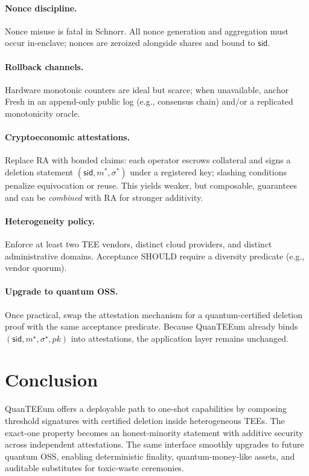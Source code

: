 \documentclass[runningheads,orivec]{llncs}
\newcommand{\prot}{\textsf{QuanTEEum}}
\newcommand{\sid}{\mathsf{sid}}
\begin{document}
\paragraph{Nonce discipline.}
Nonce misuse is fatal in Schnorr. All nonce generation and aggregation must occur in-enclave; nonces are zeroized alongside shares and bound to $\sid$.

\paragraph{Rollback channels.}
Hardware monotonic counters are ideal but scarce; when unavailable, anchor \textsf{Fresh} in an append-only public log (e.g., consensus chain) and/or a replicated monotonicity oracle.

\paragraph{Cryptoeconomic attestations.}
Replace RA with bonded claims: each operator escrows collateral and signs a deletion statement $(\sid,m^{*},\sigma^{*})$ under a registered key; slashing conditions penalize equivocation or reuse. This yields weaker, but composable, guarantees and can be \emph{combined} with RA for stronger additivity.

\paragraph{Heterogeneity policy.}
Enforce at least two TEE vendors, distinct cloud providers, and distinct administrative domains. Acceptance SHOULD require a diversity predicate (e.g., vendor quorum).

\paragraph{Upgrade to quantum OSS.}
Once practical, swap the attestation mechanism for a quantum-certified deletion proof with the same acceptance predicate. Because \prot{} already binds $(\mathsf{sid},m^{\star},\sigma^{\star},pk)$ into attestations, the application layer remains unchanged.

\section{Conclusion}
\prot{} offers a deployable path to one-shot capabilities by composing threshold signatures with certified deletion inside heterogeneous TEEs. The exact-one property becomes an honest-minority statement with additive security across independent attestations. The same interface smoothly upgrades to future quantum OSS, enabling deterministic finality, quantum-money-like assets, and auditable substitutes for toxic-waste ceremonies.



\end{document}
